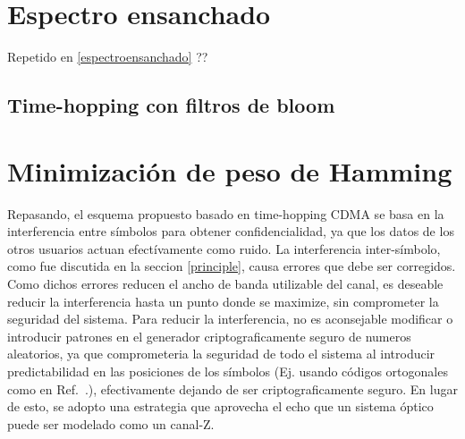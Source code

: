 \section{Espectro ensanchado}

Repetido en \ref{espectroensanchado} ??
\subsection{Time-hopping con filtros de bloom}

\section{Minimización de peso de Hamming}

Repasando, el esquema propuesto basado en time-hopping CDMA se basa en la interferencia entre símbolos para obtener confidencialidad, ya que los datos de los otros usuarios actuan efectívamente como ruido.
La interferencia inter-símbolo, como fue discutida en la seccion \ref{principle}, causa errores que debe ser corregidos. Como dichos errores reducen el ancho de banda utilizable del canal, es deseable reducir la interferencia hasta un punto donde se maximize, sin comprometer la seguridad del sistema. Para reducir la interferencia, no es aconsejable modificar o introducir patrones en el generador criptograficamente seguro de numeros aleatorios, ya que comprometeria la seguridad de todo el sistema al introducir predictabilidad en las posiciones de los símbolos (Ej. usando códigos ortogonales como en Ref.~\cite{Nadarajah2006}.), efectivamente dejando de ser criptograficamente seguro.
En lugar de esto, se adopto una estrategia que aprovecha el echo que un sistema óptico puede ser modelado como un canal-Z.


